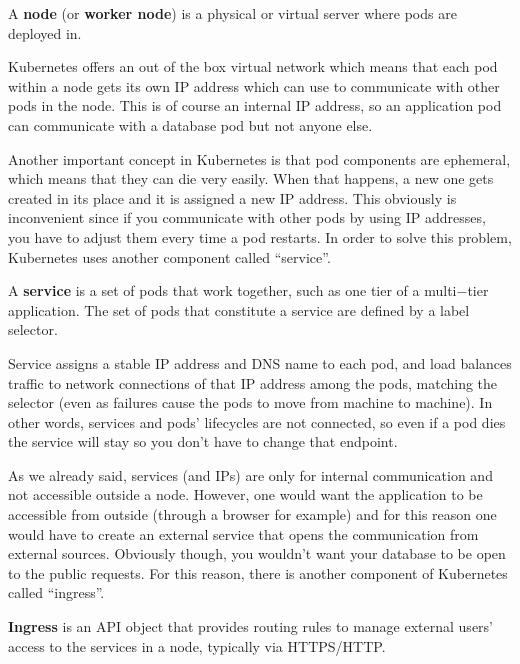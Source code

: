 A \textbf{node} (or \textbf{worker node}) is a physical or virtual server where pods are deployed in.
\ed


Kubernetes offers an out of the box virtual network which means that each pod within a node gets its own IP address
which can use to communicate with other pods in the node. This is of course an internal IP address, so an application
pod can communicate with a database pod but not anyone else.


Another important concept in Kubernetes is that pod components are ephemeral, which means that they can die very
easily. When that happens, a new one gets created in its place and it is assigned a new IP address. This obviously is
inconvenient since if you communicate with other pods by using IP addresses, you have to adjust them every time a pod
restarts. In order to solve this problem, Kubernetes uses another component called ``service''.

\bd[Service]
A \textbf{service} is a set of pods that work together, such as one tier of a multi$-$tier application. The set of
pods that constitute a service are defined by a label selector.
\ed

Service assigns a stable IP address and DNS name to each pod, and load balances traffic to network connections of
that IP address among the pods, matching the selector (even as failures cause the pods to move from machine to
machine). In other words, services and pods' lifecycles are not connected, so even if a pod dies the service will
stay so you don't have to change that endpoint.


As we already said, services (and IPs) are only for internal communication and not accessible outside a node.
However, one would want the application to be accessible from outside (through a browser for example) and for this
reason one would have to create an external service that opens the communication from external sources. Obviously
though, you wouldn't want your database to be open to the public requests. For this reason, there is another
component of Kubernetes called ``ingress''.

\bd[Ingress]
\textbf{Ingress} is an API object that provides routing rules to manage external users' access to the services in a
node, typically via HTTPS/HTTP\@.
\ed


